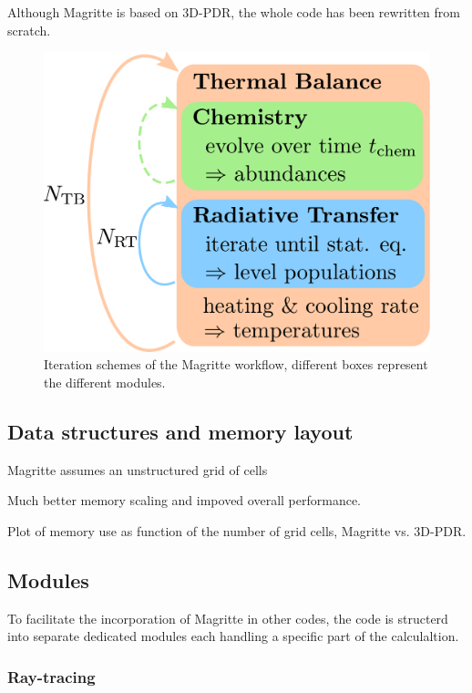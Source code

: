 \documentclass[a4paper,fleqn,usenatbib]{mnras}
\begin{document}
Although Magritte is based on 3D-PDR, the whole code has been rewritten from scratch.


\begin{figure}
	\centering
	\includegraphics[width=.9\columnwidth]{figures/scheme.pdf}
  \caption{Iteration schemes of the Magritte workflow, different boxes represent the different modules.}
  \label{scheme}
\end{figure}



\subsection{Data structures and memory layout}

Magritte assumes an unstructured grid of cells


Much better memory scaling and impoved overall performance.

Plot of memory use as function of the number of grid cells, Magritte vs. 3D-PDR.


\subsection{Modules}

To facilitate the incorporation of Magritte in other codes, the code is structerd into separate dedicated modules each handling a specific part of the calculaltion.

\subsubsection{Ray-tracing}
\end{document}
